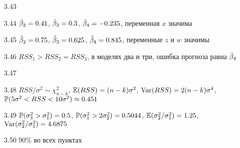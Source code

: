 \protect \hypertarget {soln:3.43}{}
\begin{solution}{{3.43}}
\end{solution}
\protect \hypertarget {soln:3.44}{}
\begin{solution}{{3.44}}
$\hb_2=0.41$, $\hb_3=0.3$, $\hb_4= -0.235$, переменная $x$ значима
\end{solution}
\protect \hypertarget {soln:3.45}{}
\begin{solution}{{3.45}}
$\hb_2=0.75$, $\hb_3=0.625$, $\hb_4= 0.845$, переменные $z$ и $w$ значимы
\end{solution}
\protect \hypertarget {soln:3.46}{}
\begin{solution}{{3.46}}
$RSS_1 > RSS_2 = RSS_3$, в моделях два и три, ошибка прогноза равна $\hb_4$
\end{solution}
\protect \hypertarget {soln:3.47}{}
\begin{solution}{{3.47}}
\end{solution}
\protect \hypertarget {soln:3.48}{}
\begin{solution}{{3.48}}
$RSS/\sigma^2\sim\chi^2_{n-k}$, $\E(RSS)=(n-k)\sigma^2$, $\Var(RSS)=2(n-k)\sigma^4$, $\P(5\sigma^2<RSS<10\sigma^2)\approx 0.451$
\end{solution}
\protect \hypertarget {soln:3.49}{}
\begin{solution}{{3.49}}
$\P(\hs_3^2>\hs_1^2)=0.5$, $\P(\hs_1^2>2\hs_2^2)=0.5044$, $\E(\hs_2^2/\hs_1^2)=1.25$, $\Var(\hs_2^2/\hs_1^2)=4.6875$
 
\end{solution}
\protect \hypertarget {soln:3.50}{}
\begin{solution}{{3.50}}
90\% во всех пунктах
\end{solution}
\protect \hypertarget {soln:3.51}{}

